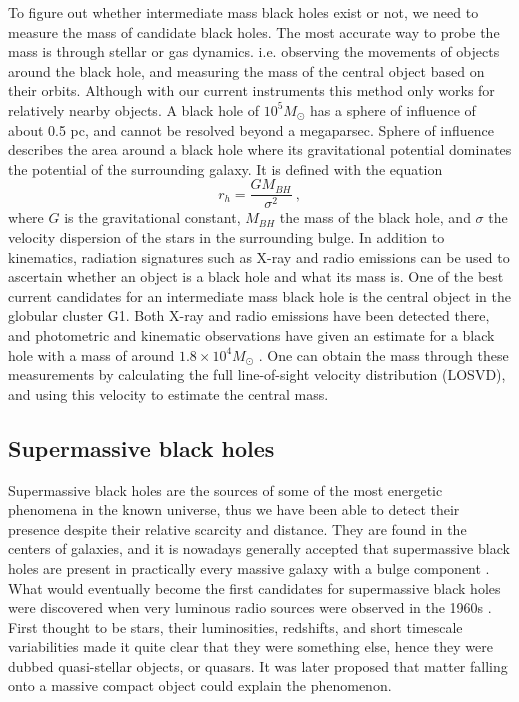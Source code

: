 \documentclass[english, oneside]{HYgradu}
\begin{document}
To figure out whether intermediate mass black holes exist or not, we need to measure the mass of candidate black holes. The most accurate way to probe the mass is through stellar or gas dynamics. i.e. observing the movements of objects around the black hole, and measuring the mass of the central object based on their orbits. Although with our current instruments this method only works for relatively nearby objects. A black hole of $10^5 M_\odot$ has a sphere of influence of about 0.5 pc, and cannot be resolved beyond a megaparsec. Sphere of influence describes the area around a black hole where its gravitational potential dominates the potential of the surrounding galaxy. It is defined with the equation 
\begin{equation}
r_h = \frac{G M_{BH}}{\sigma^2} \ ,
\end{equation}
where $G$ is the gravitational constant, $M_{BH}$ the mass of the black hole, and $\sigma$ the velocity dispersion of the stars in the surrounding bulge.
In addition to kinematics, radiation signatures such as X-ray and radio emissions can be used to ascertain whether an object is a black hole and what its mass is. One of the best current candidates for an intermediate mass black hole is the central object in the globular cluster G1. Both X-ray and radio emissions have been detected there, and photometric and kinematic observations have given an estimate for a black hole with a mass of around $1.8 \times 10^4 M_\odot$ \citep{gebhardt:2005}. One can obtain the mass through these measurements by calculating the full line-of-sight velocity distribution (LOSVD), and using this velocity to estimate the central mass.

\subsection{Supermassive black holes}

Supermassive black holes are the sources of some of the most energetic phenomena in the known universe, thus we have been able to detect their presence despite their relative scarcity and distance. They are found in the centers of galaxies, and it is nowadays generally accepted that supermassive black holes are present in practically every massive galaxy with a bulge component \citep{kormendy:2013}. What would eventually become the first candidates for supermassive black holes were discovered when very luminous radio sources were observed in the 1960s \citep{greenstein:1964}. First thought to be stars, their luminosities, redshifts, and short timescale variabilities made it quite clear that they were something else, hence they were dubbed quasi-stellar objects, or quasars. It was later proposed that matter falling onto a massive compact object could explain the phenomenon.
\end{document}

